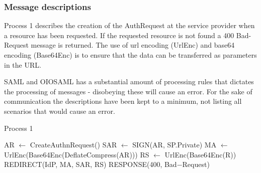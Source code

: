 \documentclass[twosided]{report}
\begin{document}
\subsubsection{Message descriptions}
Process 1 describes the creation of the AuthRequest at the service provider when a resource has been requested. If the requested resource is not found a 400 Bad-Request message is returned. The use of url encoding (UrlEnc) and base64 encoding (Base64Enc) is to ensure that the data can be transferred as parameters in the URL.
\par
SAML and OIOSAML has a substantial amount of processing rules that dictates the processing of messages - disobeying these will cause an error. For the sake of communication the descriptions have been kept to a minimum, not listing all scenarios that would cause an error.

\begin{algorithm}[H]
	\caption{Process 1}
	\begin{algorithmic}
		\STATE AR $\leftarrow$ CreateAuthnRequest()
		\STATE SAR $\leftarrow$ SIGN(AR, SP.Private)
		\STATE MA $\leftarrow$ UrlEnc(Base64Enc(DeflateCompress(AR)))
		\STATE RS $\leftarrow$ UrlEnc(Base64Enc(R))
		\RETURN REDIRECT(IdP, MA, SAR, RS)
	\ELSE
		\RETURN RESPONSE(400, Bad−Request)
	\ENDIF
	\end{algorithmic}
\end{algorithm}
\end{document}
